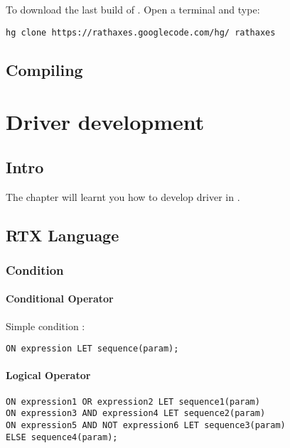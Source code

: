 \documentclass[american]{rtxreport}
\begin{document}
To download the last build of \rtx. Open a terminal and type:

\begin{verbatim}
hg clone https://rathaxes.googlecode.com/hg/ rathaxes
\end{verbatim}

\section{Compiling \rtx}

\chapter{Driver development}

\section{Intro}

The chapter will learnt you how to develop driver in \rtx.


\section{RTX Language}

\subsection{Condition}


\subsubsection{Conditional Operator}

Simple condition :

\begin{lstlisting}
ON expression LET sequence(param);
\end{lstlisting}


\subsubsection{Logical Operator}
\begin{lstlisting}
ON expression1 OR expression2 LET sequence1(param)
ON expression3 AND expression4 LET sequence2(param)
ON expression5 AND NOT expression6 LET sequence3(param)
ELSE sequence4(param);
\end{lstlisting}
\end{document}
